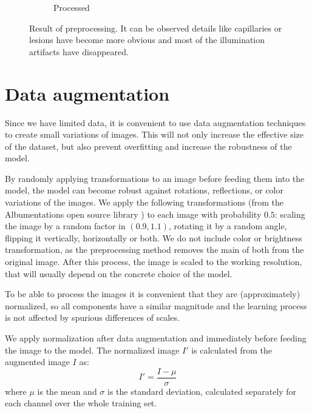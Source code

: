 \begin{figure}[tb]
\begin{subfigure}[b]{0.24\textwidth}
        \caption{Processed}
     \end{subfigure}
    \caption{Result of preprocessing. It can be observed details like capillaries or lesions have
become more obvious and most of the illumination artifacts have disappeared.}
    \label{fig:preprocess}
\end{figure}

\section{Data augmentation}
Since we have limited data, it is convenient to use data augmentation techniques to create small variations of images. This will not only increase the effective size of the dataset, but also prevent overfitting and increase the robustness of the model.

By randomly applying transformations to an image before feeding them into the model, the model can become robust against rotations, reflections, or color variations of the images. We apply the following transformations (from the Albumentations open source library \cite{albumentations}) to each image with probability \( 0.5 \): scaling the image by a random factor in  \( (0.9, 1.1) \), rotating it by a random angle, flipping it vertically, horizontally or both. We do not include color or brightness transformation, as the preprocessing method removes the main of both from the original image. After this process, the image is scaled to the working resolution, that will usually depend on the concrete choice of the model.

To be able to process the images it is convenient that they are (approximately) normalized, so all components have a similar magnitude and the learning process is not affected by spurious differences of scales.

We apply normalization after data augmentation and immediately before feeding the image to the model. The normalized image \( I' \) is calculated from the augmented image \( I \) as:
\[I' = \frac{I - \mu}{\sigma}\]
where \( \mu \) is the mean and \( \sigma \) is the standard deviation, calculated separately for each channel over the whole training set. 